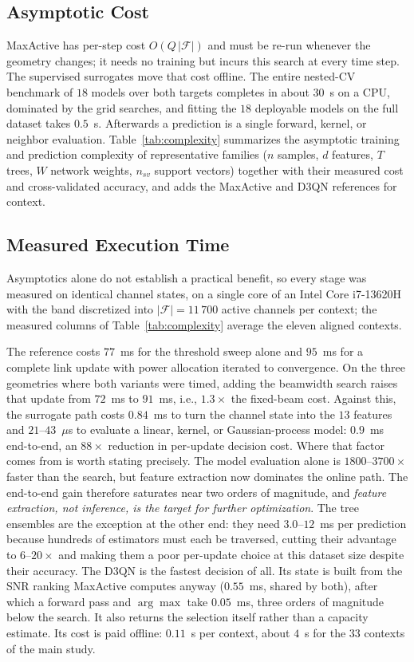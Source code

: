 \documentclass[journal]{IEEEtran}
\newcommand{\PLNCH}{11\,700}          %
\newcommand{\PLMASEL}{$77$~ms}        %
\newcommand{\PLMASTEP}{$95$~ms}       %
\newcommand{\PLMASTEPBW}{$91$~ms}     %
\newcommand{\PLPREDUS}{$0.9$~ms}      %
\begin{document}
\subsection{Asymptotic Cost}
MaxActive has per-step cost $O(Q\,|\mathcal{F}|)$ and must be re-run whenever the geometry
changes; it needs no training but incurs this search at every time step. The supervised
surrogates move that cost offline. The entire nested-CV benchmark of $18$ models over both
targets completes in about $30$~s on a CPU, dominated by the grid searches, and fitting
the $18$ deployable models on the full dataset takes $0.5$~s. Afterwards a prediction is a
single forward, kernel, or neighbor evaluation. Table~\ref{tab:complexity} summarizes the
asymptotic training and prediction complexity of representative families ($n$ samples,
$d$ features, $T$ trees, $W$ network weights, $n_{sv}$ support vectors) together with
their measured cost and cross-validated accuracy, and adds the MaxActive and D3QN
references for context.

\subsection{Measured Execution Time}
\label{sec:runtime}
Asymptotics alone do not establish a practical benefit, so every stage was measured on
identical channel states, on a single core of an Intel Core i7-13620H with the band
discretized into $|\mathcal{F}|=\PLNCH$ active channels per context; the measured columns
of Table~\ref{tab:complexity} average the eleven aligned contexts.

The reference costs \PLMASEL{} for the threshold sweep alone and \PLMASTEP{} for a
complete link update with power allocation iterated to convergence. On the three
geometries where both variants were timed, adding the beamwidth search raises that update
from $72$~ms to \PLMASTEPBW{}, i.e., $1.3\times$ the fixed-beam cost.
Against this, the surrogate path costs $0.84$~ms to turn the channel state into the $13$
features and $21$--$43$~$\mu$s to evaluate a linear, kernel, or Gaussian-process model:
\PLPREDUS{} end-to-end, an $88\times$ reduction in per-update decision cost. Where that
factor comes from is worth stating precisely. The model evaluation alone is
$1800$--$3700\times$ faster than the search, but feature extraction now dominates the
online path. The end-to-end gain therefore saturates near two orders of magnitude, and
\emph{feature extraction, not inference, is the target for further optimization}. The
tree ensembles are the exception at the other end: they need $3.0$--$12$~ms per prediction
because hundreds of estimators must each be traversed, cutting their advantage to
$6$--$20\times$ and making them a poor per-update choice at this dataset size despite
their accuracy. The D3QN is the fastest decision of all. Its state is built from the SNR
ranking MaxActive computes anyway ($0.55$~ms, shared by both), after which a forward pass
and $\arg\max$ take $0.05$~ms, three orders of magnitude below the search. It also returns
the selection itself rather than a capacity estimate. Its cost is paid offline:
$0.11$~s per context, about $4$~s for the $33$ contexts of the main study.
\end{document}
